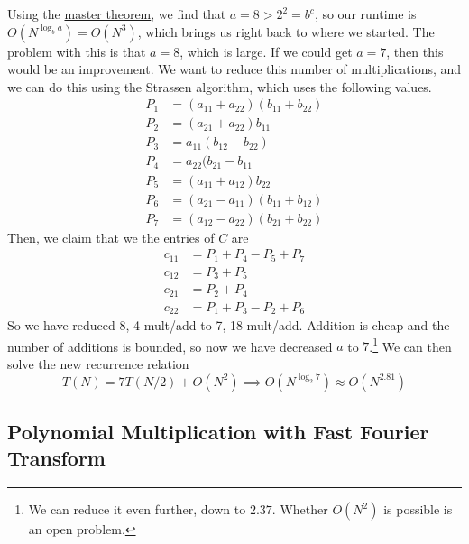     Using the \hyperref[thm:master-theorem]{master theorem}, we find that $a = 8 > 2^2 = b^c$, so our runtime is $O(N^{\log_{b} a}) = O(N^3)$, which brings us right back to where we started. The problem with this is that $a = 8$, which is large. If we could get $a = 7$, then this would be an improvement. We want to reduce this number of multiplications, and we can do this using the Strassen algorithm, which uses the following values.  
    \begin{align*}
      P_1 &= (a_{11} + a_{22}) (b_{11} + b_{22}) \\
      P_2 &= (a_{21} + a_{22}) b_{11} \\
      P_3 &= a_{11} (b_{12} - b_{22}) \\
      P_4 &= a_{22} (b_{21} - b_{11} \\
      P_5 &= (a_{11} + a_{12}) b_{22} \\
      P_6 &= (a_{21} - a_{11}) (b_{11} + b_{12}) \\
      P_7 &= (a_{12} - a_{22}) (b_{21} + b_{22}) 
    \end{align*}
    Then, we claim that we the entries of $C$ are 
    \begin{align*}
        c_{11} &= P_1 + P_4 - P_5 + P_7 \\
        c_{12} &= P_3 + P_5 \\
        c_{21} &= P_2 + P_4 \\
        c_{22} &= P_1 + P_3 - P_2 + P_6
    \end{align*}
    So we have reduced 8, 4 mult/add to 7, 18 mult/add. Addition is cheap and the number of additions is bounded, so now we have decreased $a$ to $7$.\footnote{We can reduce it even further, down to $2.37$. Whether $O(N^2)$ is possible is an open problem. } We can then solve the new recurrence relation 
    \begin{equation}
      T(N) = 7 T(N/2) + O(N^2) \implies O(N^{\log_2 7}) \approx O(N^{2.81})
    \end{equation}

\subsection{Polynomial Multiplication with Fast Fourier Transform}


